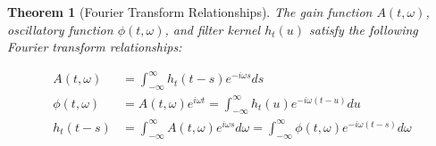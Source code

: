 \documentclass{article}
\newtheorem{theorem}{Theorem}
\begin{document}
\begin{theorem}
  [Fourier Transform Relationships] The gain function $A (t, \omega)$,
  oscillatory function $\phi (t, \omega)$, and filter kernel $h_t (u)$ satisfy
  the following Fourier transform relationships:
  
  \begin{align}
    A (t, \omega) & = \int_{- \infty}^{\infty} h_t  (t - s) e^{- i \omega s}
    ds \\
    \phi (t, \omega) & = A (t, \omega) e^{i \omega t} = \int_{-
    \infty}^{\infty} h_t (u) e^{- i \omega (t - u)} du \\
    h_t  (t - s) & = \int_{- \infty}^{\infty} A (t, \omega) e^{i \omega s} d
    \omega = \int_{- \infty}^{\infty} \phi (t, \omega) e^{- i \omega (t - s)}
    d \omega 
  \end{align}
\end{theorem}
\end{document}
